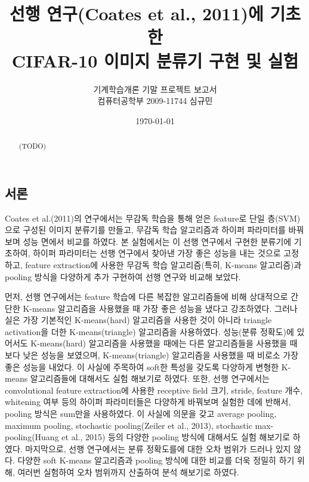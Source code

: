 \documentclass[a4paper,9pt]{article}
\begin{document}
\title{선행 연구(Coates et al., 2011)에 기초한 \\
CIFAR-10 이미지 분류기 구현 및 실험}
\author{기계학습개론 기말 프로젝트 보고서 \\
컴퓨터공학부 2009-11744 심규민}
\date{\koreandate\today}

\maketitle

\begin{abstract}
(TODO)
\end{abstract}

\tableofcontents

\pagebreak

\begin{multicols}{2}

\section{서론}

Coates et al.(2011)의 연구에서는 무감독 학습을 통해 얻은 feature로 단일 층(SVM)으로 구성된 이미지 분류기를 만들고, 무감독 학습 알고리즘과 하이퍼 파라미터를 바꿔보며 성능 면에서 비교를 하였다.
본 실험에서는 이 선행 연구에서 구현한 분류기에 기초하여, 하이퍼 파라미터는 선행 연구에서 찾아낸 가장 좋은 성능을 내는 것으로 고정하고, feature extraction에 사용한 무감독 학습 알고리즘(특히, K-means 알고리즘)과 pooling 방식을 다양하게 추가 구현하여 선행 연구와 비교해 보았다.

먼저, 선행 연구에서는 feature 학습에 다른 복잡한 알고리즘들에 비해 상대적으로 간단한 K-means 알고리즘을 사용했을 때 가장 좋은 성능을 냈다고 강조하였다.
그러나 실은 가장 기본적인 K-means(hard) 알고리즘을 사용한 것이 아니라 triangle activation을 더한 K-means(triangle) 알고리즘을 사용하였다.
성능(분류 정확도)에 있어서도 K-means(hard) 알고리즘을 사용했을 때에는 다른 알고리즘들을 사용했을 때 보다 낮은 성능을 보였으며, K-means(triangle) 알고리즘을 사용했을 때 비로소 가장 좋은 성능을 내었다.
이 사실에 주목하여 soft한 특성을 갖도록 다양하게 변형한 K-means 알고리즘들에 대해서도 실험 해보기로 하였다.
또한, 선행 연구에서는 convolutional feature extraction에 사용한 receptive field 크기, stride, feature 개수, whitening 여부 등의 하이퍼 파라미터들은 다양하게 바꿔보며 실험한 데에 반해서, pooling 방식은 sum만을 사용하였다.
이 사실에 의문을 갖고 average pooling, maximum pooling, stochastic pooling(Zeiler et al., 2013), stochastic max-pooling(Huang et al., 2015) 등의 다양한 pooling 방식에 대해서도 실험 해보기로 하였다.
마지막으로, 선행 연구에서는 분류 정확도를에 대한 오차 범위가 드러나 있지 않다.
다양한 soft K-means 알고리즘과 pooling 방식에 대한 비교를 더욱 정밀히 하기 위해, 여러번 실험하여 오차 범위까지 산출하여 분석 해보기로 하였다.


\end{multicols}
\end{document}
